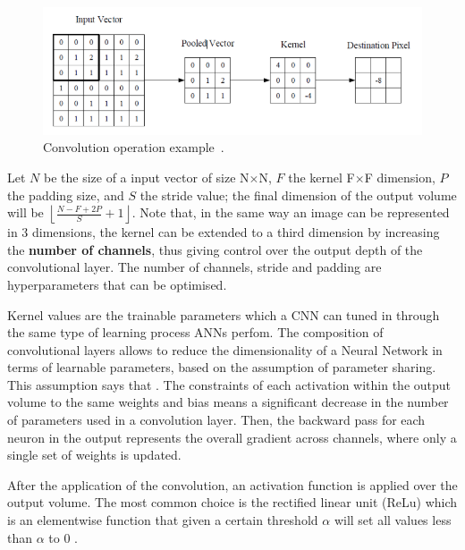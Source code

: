 \begin{figure}[!h]
    \centering
    \includegraphics[scale=.45]{imagenes/appendices/appendix_a/convolution.PNG}
    \caption{Convolution operation example~\cite{appendix:OSheaN15}.}
    \label{fig:convolutionPoolingExample}
\end{figure}

Let $N$ be the size of a input vector of size N$\times$N, $F$ the kernel F$\times$F dimension, 
$P$ the padding size, and $S$ the stride value; the final dimension of the output volume will 
be $\left\lfloor \frac{N - F + 2P}{S} + 1 \right\rfloor$. Note that, in the same way an image can be 
represented in 3 dimensions, the kernel can be extended to a third dimension by increasing 
the \textbf{number of channels}, thus giving control over the output depth of the 
convolutional layer. The number of channels, stride and padding are hyperparameters that can 
be optimised. 

Kernel values are the trainable parameters which a CNN can tuned in through the same type 
of learning process ANNs perfom. The composition of convolutional layers allows to reduce the 
dimensionality of a Neural Network in terms of learnable parameters, based on the assumption 
of parameter sharing. This assumption says that . The constraints of 
each activation within the output volume to the same weights and bias means a significant 
decrease in the number of parameters used in a convolution layer. Then, the backward pass for 
each neuron in the output represents the overall gradient across channels, where only a 
single set of weights is updated.

After the application of the convolution, an activation function is applied over the output 
volume. The most common choice is the rectified linear unit (ReLu) which is an elementwise 
function that given a certain threshold $\alpha$ will set all values less than $\alpha$ to 0 .

